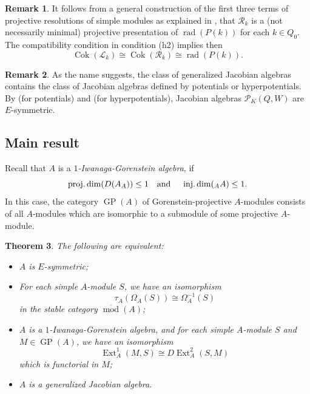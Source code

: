 \documentclass[12pt,reqno]{amsart}
\newtheorem{Thm}{Theorem}[section]
\theoremstyle{definition}
\newtheorem{Rem}[Thm]{Remark}
\newcommand{\scL}{{\mathscr L}}
\newcommand{\scR}{{\mathscr R}}
\newcommand{\cP}{{\mathcal P}}
\newcommand{\md}{\operatorname{mod}}
\newcommand{\Jacobi}{\cP}
\newcommand{\pdim}{\operatorname{proj.dim}}
\newcommand{\idim}{\operatorname{inj.dim}}
\newcommand{\rad}{\operatorname{rad}}
\newcommand{\GP}{\operatorname{GP}}
\newcommand{\Ext}{\operatorname{Ext}}
\newcommand{\Coker}{\operatorname{Cok}}
\begin{document}
\begin{Rem}
It follows from a general construction of the first three terms of
projective resolutions of simple modules as explained in
\cite[Section~5.4]{GHLS26}, 
that
$\scR_k$ is a 
(not necessarily minimal) 
projective presentation
of $\rad(P(k))$ for each $k \in Q_0$.
The compatibility condition in condition (h2) implies then
$$
\Coker(\scL_k) \cong \Coker(\scR_k) \cong \rad(P(k)).
$$
\end{Rem}

\begin{Rem}
As the name suggests, the class of
generalized Jacobian algebras contains the class of Jacobian algebras defined by potentials or hyperpotentials.
By \cite{DWZ10} (for potentials) and \cite{GHLS26} (for hyperpotentials), Jacobian algebras $\Jacobi_K(Q,W)$ are $E$-symmetric.
\end{Rem}

\subsection{Main result}
Recall that $A$ is a \emph{$1$-Iwanaga-Gorenstein algebra}, 
if $$
\pdim(D(A_A)) \le 1
\text{\quad and \quad}
\idim({_A}A) \le 1.
$$
In this case, the
category $\GP(A)$ of Gorenstein-projective $A$-modules consists of
all $A$-modules which are isomorphic to a submodule of some projective $A$-module.


\begin{Thm}\label{thm:main1}
The following are equivalent:
\begin{itemize}\itemsep2mm

\item[(i)]
$A$ is $E$-symmetric;

\item[(ii)]
For each simple $A$-module $S$, we have 
an isomorphism
$$
\tau_A(\Omega_A(S)) \cong \Omega_A^{-1}(S)
$$ 
in the stable category $\overline{\md}(A)$;


\item[(iii)]
$A$ is a $1$-Iwanaga-Gorenstein algebra, and for each simple $A$-module $S$ and $M \in \GP(A)$, we have an isomorphism
$$
\Ext_A^1(M,S) \cong D\!\Ext_A^2(S,M)
$$
which is functorial in $M$;

\item[(iv)]
$A$ is a generalized Jacobian algebra.

\end{itemize}
\end{Thm}
\end{document}
